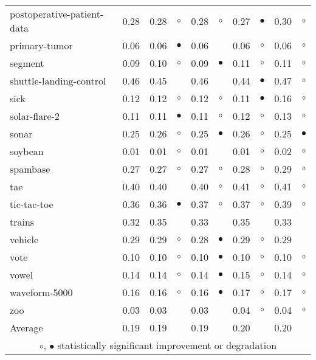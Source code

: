 \begin{table}[H]
{\begin{tabular}{lrr@{\hspace{0.1cm}}cr@{\hspace{0.1cm}}cr@{\hspace{0.1cm}}cr@{\hspace{0.1cm}}c}
postoperative-patient-data & 0.28 & 0.28 &    $\circ$ & 0.28 &    $\circ$ & 0.27 & $\bullet$ & 0.30 &   $\circ$\\
primary-tumor & 0.06 & 0.06 &  $\bullet$ & 0.06 &            & 0.06 &   $\circ$ & 0.06 &   $\circ$\\
segment & 0.09 & 0.10 &    $\circ$ & 0.09 &  $\bullet$ & 0.11 &   $\circ$ & 0.11 &   $\circ$\\
shuttle-landing-control & 0.46 & 0.45 &            & 0.46 &            & 0.44 & $\bullet$ & 0.47 &   $\circ$\\
sick & 0.12 & 0.12 &    $\circ$ & 0.12 &    $\circ$ & 0.11 & $\bullet$ & 0.16 &   $\circ$\\
solar-flare-2 & 0.11 & 0.11 &  $\bullet$ & 0.11 &    $\circ$ & 0.12 &   $\circ$ & 0.13 &   $\circ$\\
sonar & 0.25 & 0.26 &    $\circ$ & 0.25 &  $\bullet$ & 0.26 &   $\circ$ & 0.25 & $\bullet$\\
soybean & 0.01 & 0.01 &    $\circ$ & 0.01 &            & 0.01 &   $\circ$ & 0.02 &   $\circ$\\
spambase & 0.27 & 0.27 &    $\circ$ & 0.27 &    $\circ$ & 0.28 &   $\circ$ & 0.29 &   $\circ$\\
tae & 0.40 & 0.40 &            & 0.40 &    $\circ$ & 0.41 &   $\circ$ & 0.41 &   $\circ$\\
tic-tac-toe & 0.36 & 0.36 &  $\bullet$ & 0.37 &    $\circ$ & 0.37 &   $\circ$ & 0.39 &   $\circ$\\
trains & 0.32 & 0.35 &            & 0.33 &            & 0.35 &           & 0.33 &          \\
vehicle & 0.29 & 0.29 &    $\circ$ & 0.28 &  $\bullet$ & 0.29 &   $\circ$ & 0.29 &          \\
vote & 0.10 & 0.10 &    $\circ$ & 0.10 &  $\bullet$ & 0.10 &   $\circ$ & 0.10 &   $\circ$\\
vowel & 0.14 & 0.14 &    $\circ$ & 0.14 &  $\bullet$ & 0.15 &   $\circ$ & 0.14 &   $\circ$\\
waveform-5000 & 0.16 & 0.16 &    $\circ$ & 0.16 &  $\bullet$ & 0.17 &   $\circ$ & 0.17 &   $\circ$\\
zoo & 0.03 & 0.03 &            & 0.03 &            & 0.04 &   $\circ$ & 0.04 &   $\circ$\\
\hline
Average & 0.19 & 0.19 &            & 0.19 &            & 0.20 &           & 0.20 &          \\
\hline
\multicolumn{10}{c}{$\circ$, $\bullet$ statistically significant improvement or degradation}\\
\end{tabular} \footnotesize \par}
\end{table}
